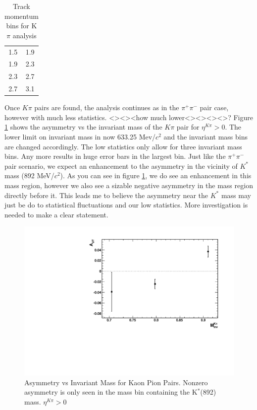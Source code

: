 \documentclass[abstract = on,listof=totoc, bibliography=totoc]{scrreprt}
\newcommand{\pip}{\pi^+}
\newcommand{\pim}{\pi^-}
\newcommand{\pair}{$\pip\pim$ }
\newcommand{\etakp}{\eta^{K\pi}}
\begin{document}
\begin{center}
\begin{table}[h!]
\caption{Track momentum bins for K$\pi$ analysis}
\begin{tabular}{cc} 
1.5 & 1.9 \\
1.9 & 2.3 \\
2.3 & 2.7 \\
2.7 & 3.1 \\
\end{tabular}
\label{tab:pBinsKpi}
\end{table}
\end{center}

Once $K\pi$ pairs are found, the analysis continues as in the \pair pair case, however with much less statistics. <><><how much lower<><><><>? Figure \ref{fig:AutVMass_KPi} shows the asymmetry vs the invariant mass of the $K\pi$ pair for $\etakp > 0$. The lower limit on invariant mass in now 633.25 Mev/$c^2$ and the invariant mass bins are changed accordingly. The low statistics only allow for three invariant mass bins. Any more results in huge error bars in the largest bin. Just like the \pair pair scenario, we expect an enhancement to the asymmetry in the vicinity of $K^*$ mass (892 MeV/$c^2$). As you can see in figure \ref{fig:AutVMass_KPi}, we do see an enhancement in this mass region, however we also see a sizable negative asymmetry in the mass region directly before it. This leads me to believe the asymmetry near the $K^*$ mass may just be do to statistical fluctuations and our low statistics. More investigation is needed to make a clear statement. 

\begin{figure}
\begin{center}
\includegraphics[width = .6\textwidth]{AutVMass_KPi}
\caption[Asymmetry vs Invariant Mass for Kaon Pion Pairs]{Asymmetry vs Invariant Mass for Kaon Pion Pairs. Nonzero asymmetry is only seen in the mass bin containing the K$^*$(892) mass. $\etakp > 0$}
\label{fig:AutVMass_KPi}
\end{center}
\end{figure}
\end{document}
